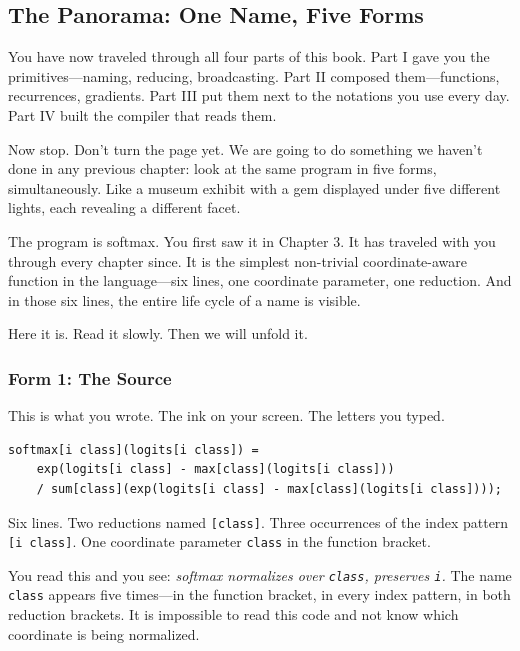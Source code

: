 \documentclass[11pt,titlepage]{article}
\begin{document}
\vspace{2em}

\hypertarget{the-panorama-one-name-five-forms}{%
\subsection{The Panorama: One Name, Five
Forms}\label{the-panorama-one-name-five-forms}}

You have now traveled through all four parts of this book. Part I gave
you the primitives---naming, reducing, broadcasting. Part II composed
them---functions, recurrences, gradients. Part III put them next to the
notations you use every day. Part IV built the compiler that reads them.

Now stop. Don't turn the page yet. We are going to do something we
haven't done in any previous chapter: look at the same program in five
forms, simultaneously. Like a museum exhibit with a gem displayed under
five different lights, each revealing a different facet.

The program is softmax. You first saw it in Chapter 3. It has traveled
with you through every chapter since. It is the simplest non-trivial
coordinate-aware function in the language---six lines, one coordinate
parameter, one reduction. And in those six lines, the entire life cycle
of a name is visible.

Here it is. Read it slowly. Then we will unfold it.

\vspace{2em}

\hypertarget{form-1-the-source}{%
\subsubsection{Form 1: The Source}\label{form-1-the-source}}

This is what you wrote. The ink on your screen. The letters you typed.

\begin{verbatim}
softmax[i class](logits[i class]) =
    exp(logits[i class] - max[class](logits[i class]))
    / sum[class](exp(logits[i class] - max[class](logits[i class])));
\end{verbatim}

Six lines. Two reductions named \texttt{{[}class{]}}. Three occurrences
of the index pattern \texttt{{[}i\ class{]}}. One coordinate parameter
\texttt{class} in the function bracket.

You read this and you see: \emph{softmax normalizes over \texttt{class},
preserves \texttt{i}.} The name \texttt{class} appears five times---in
the function bracket, in every index pattern, in both reduction
brackets. It is impossible to read this code and not know which
coordinate is being normalized.
\end{document}
